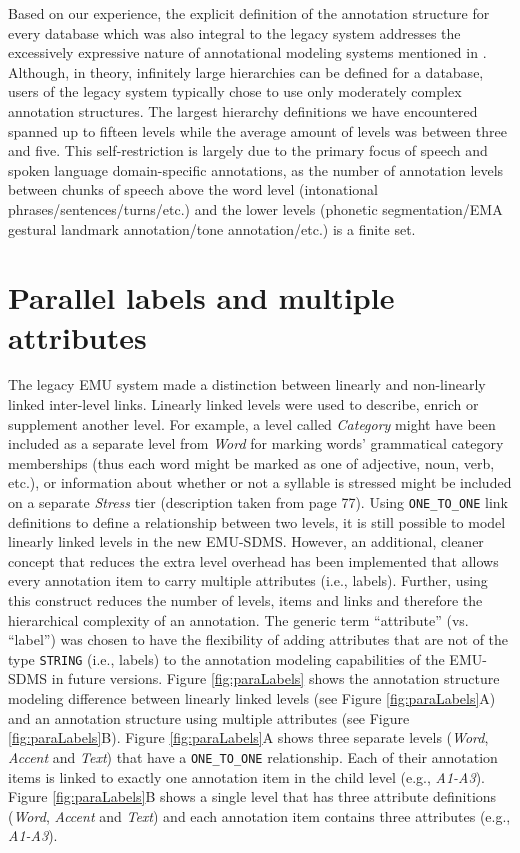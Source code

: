 \documentclass[]{book}
\begin{document}
Based on our experience, the explicit definition of the annotation structure for every database which was also integral to the legacy system addresses the excessively expressive nature of annotational modeling systems mentioned in \citet{bird:sc2001a}. Although, in theory, infinitely large hierarchies can be defined for a database, users of the legacy system typically chose to use only moderately complex annotation structures. The largest hierarchy definitions we have encountered spanned up to fifteen levels while the average amount of levels was between three and five. This self-restriction is largely due to the primary focus of speech and spoken language domain-specific annotations, as the number of annotation levels between chunks of speech above the word level (intonational phrases/sentences/turns/etc.) and the lower levels (phonetic segmentation/EMA gestural landmark annotation/tone annotation/etc.) is a finite set.

\hypertarget{parallel-labels-and-multiple-attributes}{%
\section{Parallel labels and multiple attributes}\label{parallel-labels-and-multiple-attributes}}

The legacy EMU system made a distinction between linearly and non-linearly linked inter-level links. Linearly linked levels were used to describe, enrich or supplement another level. For example, a level called \emph{Category} might have been included as a separate level from \emph{Word} for marking words' grammatical category memberships (thus each word might be marked as one of adjective, noun, verb, etc.), or information about whether or not a syllable is stressed might be included on a separate \emph{Stress} tier (description taken from \citet{harrington:2010a} page 77). Using \texttt{ONE\_TO\_ONE} link definitions to define a relationship between two levels, it is still possible to model linearly linked levels in the new EMU-SDMS. However, an additional, cleaner concept that reduces the extra level overhead has been implemented that allows every annotation item to carry multiple attributes (i.e., labels). Further, using this construct reduces the number of levels, items and links and therefore the hierarchical complexity of an annotation. The generic term ``attribute'' (vs. ``label'') was chosen to have the flexibility of adding attributes that are not of the type \texttt{STRING} (i.e., labels) to the annotation modeling capabilities of the EMU-SDMS in future versions. Figure \ref{fig:paraLabels} shows the annotation structure modeling difference between linearly linked levels (see Figure \ref{fig:paraLabels}A) and an annotation structure using multiple attributes (see Figure \ref{fig:paraLabels}B). Figure \ref{fig:paraLabels}A shows three separate levels (\emph{Word}, \emph{Accent} and \emph{Text}) that have a \texttt{ONE\_TO\_ONE} relationship. Each of their annotation items is linked to exactly one annotation item in the child level (e.g., \emph{A1-A3}). Figure \ref{fig:paraLabels}B shows a single level that has three attribute definitions (\emph{Word}, \emph{Accent} and \emph{Text}) and each annotation item contains three attributes (e.g., \emph{A1-A3}).
\end{document}
